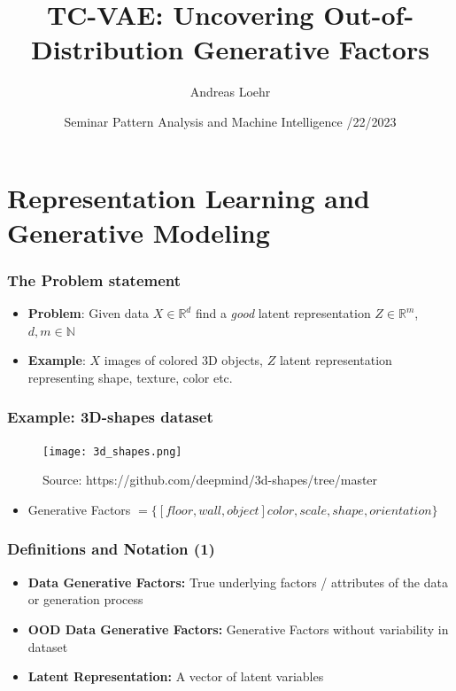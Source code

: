 \documentclass{beamer}
\title[]{TC-VAE: Uncovering Out-of-Distribution Generative Factors}
\author{Andreas Loehr}
\institute{Goethe Universität Frankfurt a.M.}
\date{
  \vspace{0.2cm}
  Seminar Pattern Analysis and Machine Intelligence
  \vspace{0.4cm}
  \newline 06/22/2023\\
  \vspace{0.3cm} %
  }
\theoremstyle{definition}
\begin{document}
  \AtBeginSection[]
  {
      \begin{frame}
          \tableofcontents[currentsection]
      \end{frame}
    }
  \begin{frame}
    \begin{titlepage}
    \end{titlepage}
  \end{frame}

  \section{Representation Learning and Generative Modeling}
    \begin{frame}
      \frametitle{The Problem statement}
      \begin{itemize}
        \item \textbf{Problem}: Given data $X \in \mathbb{R}^{d}$ find a \textit{good} latent representation $Z \in \mathbb{R}^{m}$, $d, m \in \mathbb{N}$
        \item \textbf{Example}: $X$ images of colored 3D objects, $Z$ latent representation representing shape, texture, color etc.
      \end{itemize}
     \end{frame}

     \begin{frame}
      \frametitle{Example: 3D-shapes dataset}
      \begin{figure}
        \centering
        \texttt{[image: 3d\_shapes.png]}
        \captionsetup{justification=centering}
        \caption*{\tiny{Source: https://github.com/deepmind/3d-shapes/tree/master}}
      \end{figure}
      \begin{itemize}
        \item Generative Factors $=\{[floor, wall, object] color, scale, shape, orientation\}$
      \end{itemize}
     \end{frame}

      \begin{frame}
        \frametitle{Definitions and Notation (1)}
        \begin{itemize}
          \item \textbf{Data Generative Factors:} True underlying factors / attributes of the data or generation process
          \item \textbf{OOD Data Generative Factors:} Generative Factors without variability in dataset
          \item \textbf{Latent Representation:} A vector of latent variables
        \end{itemize}
      \end{frame}
\end{document}
